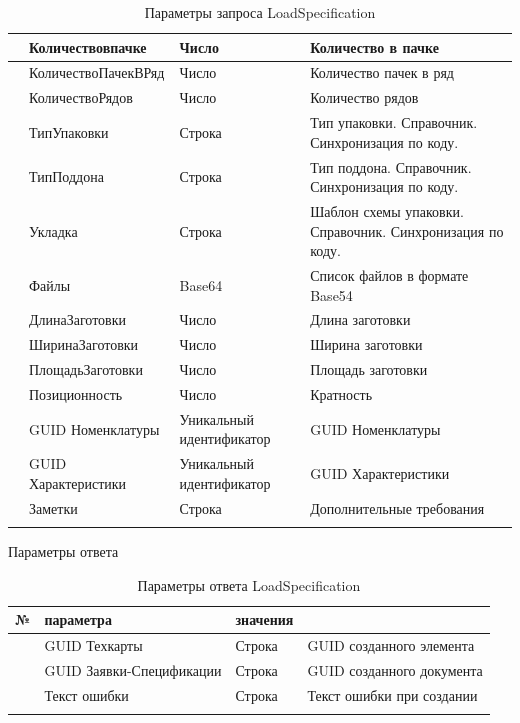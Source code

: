 \begin{longtable}{|p{10mm}|p{35mm}|p{40mm}|p{60mm}|}
\hline
\parbox[c][5mm]{9mm}{\p} &  Количествовпачке & Число &  {Количество в пачке} \\
\hline
\parbox[c][5mm]{9mm}{\p} &  КоличествоПачекВРяд & Число &  {Количество пачек в ряд} \\
\hline
\parbox[c][5mm]{9mm}{\p} &  КоличествоРядов & Число &  {Количество рядов} \\
\hline
\parbox[c][5mm]{9mm}{\p} &  ТипУпаковки & Строка &  {Тип упаковки. Справочник. Синхронизация по коду.} \\
\hline
\parbox[c][5mm]{9mm}{\p} &  ТипПоддона & Строка &  {Тип поддона. Справочник. Синхронизация по коду.} \\
\hline
\parbox[c][5mm]{9mm}{\p} &  Укладка & Строка &  {Шаблон схемы упаковки. Справочник. Синхронизация по коду.} \\
\hline
\parbox[c][5mm]{9mm}{\p} &  Файлы & \parbox{52mm}{Base64} &  {Список файлов в формате Base54} \\
\hline
\parbox[c][5mm]{9mm}{\p} &  ДлинаЗаготовки & Число &  {Длина заготовки} \\
\hline
\parbox[c][5mm]{9mm}{\p} &  ШиринаЗаготовки & Число &  {Ширина заготовки} \\
\hline
\parbox[c][5mm]{9mm}{\p} &  ПлощадьЗаготовки & Число &  {Площадь заготовки} \\
\hline
\parbox[c][5mm]{9mm}{\p} &  Позиционность & Число &  {Кратность} \\
\hline
\parbox[c][5mm]{9mm}{\p} &  GUID Номенклатуры & Уникальный идентификатор  &  {GUID Номенклатуры} \\
\hline
\parbox[c][5mm]{9mm}{\p} &  GUID Характеристики & Уникальный идентификатор &  {GUID Характеристики} \\
\hline
\parbox[c][5mm]{9mm}{\p} &  Заметки & Строка &  {Дополнительные  требования} \\
\hline
\caption{Параметры запроса LoadSpecification}\label{ex:in_LoadDesign}
\end{longtable}  
\normalsize



Параметры ответа
\pc
\scriptsize
\begin{longtable}{|p{10mm}|p{40mm}|p{20mm}|p{75mm}|}
\hline
\parbox[c][5mm]{10mm}{\centering№} & \parbox[c]{40mm}{ параметра} & \parbox[c]{20mm}{ значения} & \parbox[c]{75mm}{} \\
\hline
\parbox[c][5mm]{15mm}{\p} & \parbox{70mm}{GUID Техкарты} & \parbox{54mm}{Строка} & \parbox{49mm}{GUID созданного элемента} \\
\hline
\parbox[c][5mm]{15mm}{\p} & \parbox{70mm}{GUID Заявки-Спецификации} & \parbox{54mm}{Строка} & \parbox{49mm}{GUID созданного документа} \\
\hline
\parbox[c][5mm]{15mm}{\p} & \parbox{70mm}{Текст ошибки} & \parbox{54mm}{Строка} & \parbox{49mm}{Текст ошибки при создании} \\
\hline
\caption{Параметры ответа LoadSpecification}\label{ex:out_LoadDesign}
\end{longtable}  
\normalsize





